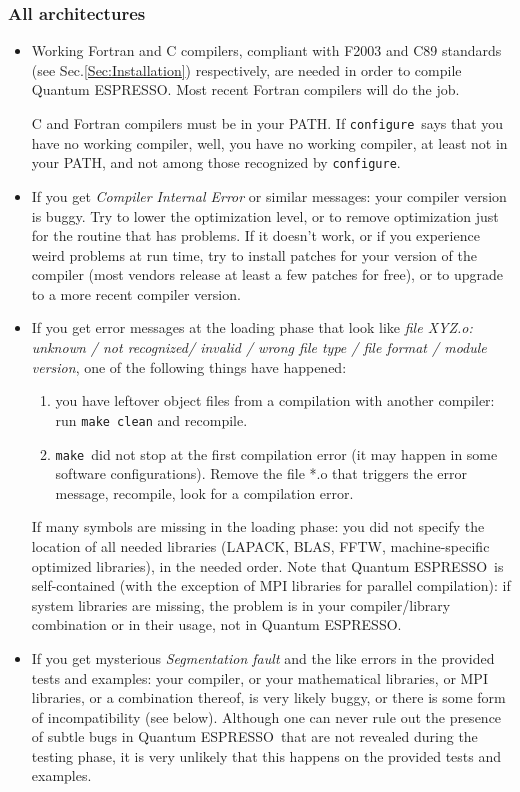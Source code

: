 \documentclass[12pt,a4paper]{article}
\def\qe{{\sc Quantum ESPRESSO}}
\def\configure{\texttt{configure}}
\def\make{\texttt{make}}
\begin{document}
\subsubsection{All architectures}
\begin{itemize}
\item
Working Fortran and C compilers, compliant with F2003 and C89 standards
(see Sec.\ref{Sec:Installation})
respectively, are needed in order to compile \qe. Most recent Fortran
compilers will do the job.

C and Fortran compilers must be in your PATH.
If \configure\ says that you have no working compiler, well,
you have no working compiler, at least not in your PATH, and
not among those recognized by \configure.
\item
If you get {\em Compiler Internal Error} or similar messages: your
compiler version is buggy. Try to lower the optimization level, or to
remove optimization just for the routine that has problems. If it
doesn't work, or if you experience weird problems at run time, try to
install patches for your version of the compiler (most vendors release
at least a few patches for free), or to upgrade to a more recent
compiler version.
\item
If you get error messages at the loading phase that look like
{\em file XYZ.o: unknown / not recognized/ invalid / wrong
file type / file format / module version},
one of the following things have happened:
\begin{enumerate}
\item you have leftover object files from a compilation with another
  compiler: run \texttt{make clean} and recompile.
\item \make\ did not stop at the first compilation error (it may
happen in some software configurations). Remove the file *.o
that triggers the error message, recompile, look for a
compilation error.
\end{enumerate}
If many symbols are missing in the loading phase: you did not specify the
location of all needed libraries (LAPACK, BLAS, FFTW, machine-specific
optimized libraries), in the needed order.
Note that \qe\ is self-contained (with the exception of MPI libraries for
parallel compilation): if system libraries are missing, the problem is in
your compiler/library combination or in their usage, not in \qe.
\item
  If you get mysterious {\em Segmentation fault} and the like errors
  in the provided tests and examples:
your compiler, or your mathematical libraries, or MPI libraries,
or a combination thereof, is very likely buggy, or there is some
form of incompatibility (see below). Although one can never rule out
the presence of subtle bugs in \qe\ that are not revealed during
the testing phase, it is very unlikely
that this happens on the provided tests and examples.
\end{itemize}
\end{document}
